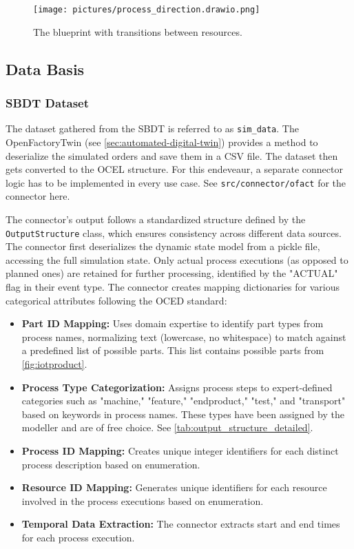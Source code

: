 \begin{figure}[H]
  \centering
  \texttt{[image: pictures/process\_direction.drawio.png]}
  \caption{The blueprint with transitions between resources.}
  \label{fig:transitions}
\end{figure}

\subsection{Data Basis}

\subsubsection{SBDT Dataset}

The dataset gathered from the SBDT is referred to as \texttt{sim\_data}. The OpenFactoryTwin (see \autoref{sec:automated-digital-twin}) provides a method to deserialize the simulated orders and save them in a CSV file. The dataset then gets converted to the OCEL structure. For this endeveaur, a separate connector logic has to be implemented in every use case. See \texttt{src/connector/ofact} for the connector here.

The connector's output follows a standardized structure defined by the \texttt{OutputStructure} class, which ensures consistency across different data sources. The connector first deserializes the dynamic state model from a pickle file, accessing the full simulation state. Only actual process executions (as opposed to planned ones) are retained for further processing, identified by the "ACTUAL" flag in their event type. The connector creates mapping dictionaries for various categorical attributes following the OCED standard:

\begin{itemize}
  \item \textbf{Part ID Mapping:} Uses domain expertise to identify part types from process names, normalizing text (lowercase, no whitespace) to match against a predefined list of possible parts. This list contains possible parts from \autoref{fig:iotproduct}.
  \item \textbf{Process Type Categorization:} Assigns process steps to expert-defined categories such as "machine," "feature," "endproduct," "test," and "transport" based on keywords in process names. These types have been assigned by the modeller and are of free choice. See \autoref{tab:output_structure_detailed}.
  \item \textbf{Process ID Mapping:} Creates unique integer identifiers for each distinct process description based on enumeration.
  \item \textbf{Resource ID Mapping:} Generates unique identifiers for each resource involved in the process executions based on enumeration.
  \item \textbf{Temporal Data Extraction:} The connector extracts start and end times for each process execution.
\end{itemize}

